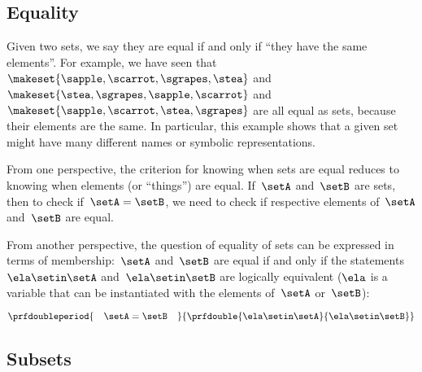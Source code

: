\subsection{Equality}

Given two sets, we say they are equal if and only if ``they have the same elements''.
For example, we have seen that~$\makeset{ \sapple, \scarrot, \sgrapes, \stea }$ and~$\makeset{ \stea, \sgrapes, \sapple, \scarrot}$ and~$\makeset{ \sapple, \scarrot, \stea, \sgrapes }$ are all equal as sets, because their elements are the same.
In particular, this example shows that a given set might have many different names or symbolic representations.

From one perspective, the criterion for knowing when sets are equal reduces to knowing when elements (or ``things'') are equal.
If~$\setA$ and~$\setB$ are sets, then to check if~$\setA = \setB$, we need to check if respective elements of~$\setA$ and~$\setB$ are equal.

From another perspective, the question of equality of sets can be expressed in terms of membership:~$\setA$ and~$\setB$ are equal if and only if the statements~$\ela \setin\setA$ and~$\ela \setin\setB$ are logically equivalent ($\ela$ is a variable that can be instantiated with the elements of~$\setA$ or~$\setB$):

\begin{equation*}
    \prfdoubleperiod{
        \quad \setA = \setB \quad
    }{
        \prfdouble{
            \ela \setin\setA
        }{
            \ela \setin\setB
        }
    }
\end{equation*}


\subsection{Subsets}

